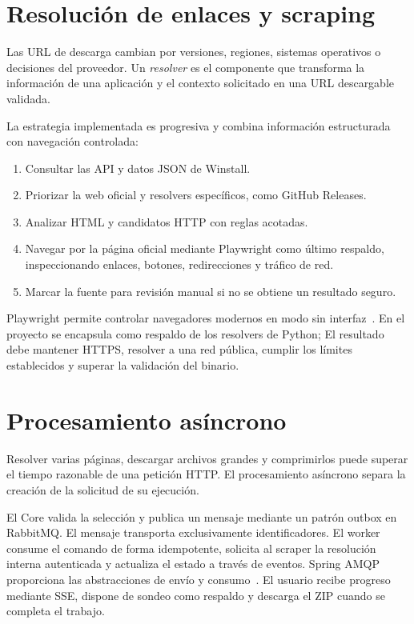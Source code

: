 \section{Resolución de enlaces y scraping}

Las URL de descarga cambian por versiones, regiones, sistemas operativos o decisiones del proveedor. Un \emph{resolver} es el componente que transforma la información de una aplicación y el contexto solicitado en una URL descargable validada.

La estrategia implementada es progresiva y combina información estructurada con navegación controlada:

\begin{enumerate}
	\item Consultar las API y datos JSON de Winstall.
	\item Priorizar la web oficial y resolvers específicos, como GitHub Releases.
	\item Analizar HTML y candidatos HTTP con reglas acotadas.
	\item Navegar por la página oficial mediante Playwright como último respaldo, inspeccionando enlaces, botones, redirecciones y tráfico de red.
	\item Marcar la fuente para revisión manual si no se obtiene un resultado seguro.
\end{enumerate}

Playwright permite controlar navegadores modernos en modo sin interfaz~\cite{playwright}. En el proyecto se encapsula como respaldo de los resolvers de Python; El resultado debe mantener HTTPS, resolver a una red pública, cumplir los límites establecidos y superar la validación del binario.

\section{Procesamiento asíncrono}

Resolver varias páginas, descargar archivos grandes y comprimirlos puede superar el tiempo razonable de una petición HTTP. El procesamiento asíncrono separa la creación de la solicitud de su ejecución.

El Core valida la selección y publica un mensaje mediante un patrón outbox en RabbitMQ. El mensaje transporta exclusivamente identificadores. El worker consume el comando de forma idempotente, solicita al scraper la resolución interna autenticada y actualiza el estado a través de eventos. Spring AMQP proporciona las abstracciones de envío y consumo~\cite{springamqp}. El usuario recibe progreso mediante SSE, dispone de sondeo como respaldo y descarga el ZIP cuando se completa el trabajo.

